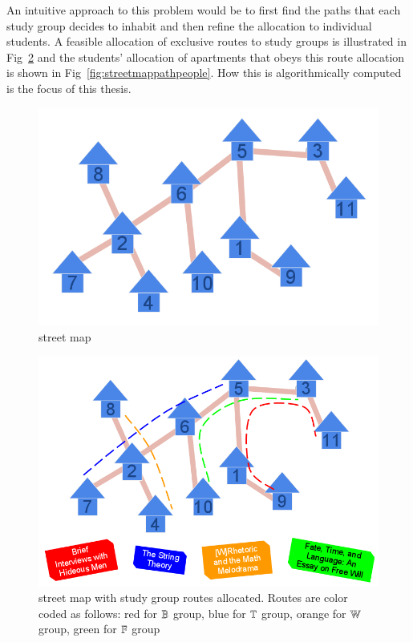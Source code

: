 \documentclass[MS,]{iitmdiss}
\begin{document}
An intuitive approach to this problem would be to first find the paths
that each study group decides to inhabit and then refine the
allocation to individual students. A feasible allocation of exclusive
routes to study groups is illustrated in Fig~\ref{fig:streetmappath}
and the students' allocation of apartments that obeys this route
allocation is shown in Fig~\ref{fig:streetmappathpeople}. How this is
algorithmically computed is the focus of this thesis.

\begin{figure}[htbp]
  \centering
  \includegraphics[scale=0.3]{../img/1_infinite_loop.png}
  \caption{{\residenceblock} street map}
  \label{fig:streetmap}
\end{figure}

\begin{figure}[htbp]
  \centering
  \includegraphics[scale=0.5]{../img/2_infinite_loop_BTWF.png}
  \caption{{\residenceblock} street map with study group routes
    allocated. Routes are color coded as follows: red for
    \textcolor{red}{$\mathbb{B}$} group, blue for \textcolor{blue}{$\mathbb{T}$}
    group, orange for \textcolor{YellowOrange}{$\mathbb{W}$} group, green for
    \textcolor{green}{$\mathbb{F}$} group}
  \label{fig:streetmappath}
\end{figure}
\end{document}
